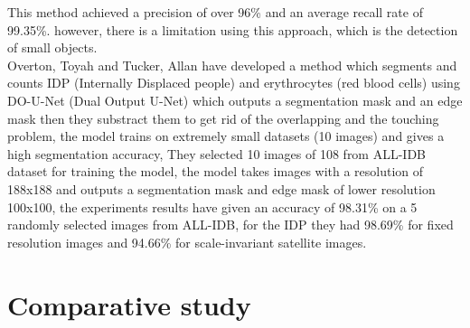 This method achieved a precision of over 96\% and an average recall rate of 99.35\%. however, there is a limitation using this approach, which is the detection of small objects.\\

Overton, Toyah and Tucker, Allan \textsuperscript{\cite{10.1007/978-3-030-44584-3_31}} have developed a method which segments and counts IDP (Internally Displaced people) and erythrocytes (red blood cells) using DO-U-Net (Dual Output U-Net) which outputs a segmentation mask and an edge mask then they substract them to get rid of the overlapping and the touching problem, the model trains on extremely small datasets (10 images) and gives a high segmentation accuracy, They selected 10 images of 108 from ALL-IDB dataset for training the model, the model takes images with a resolution of 188x188 and outputs a segmentation mask and edge mask of lower resolution 100x100, the experiments results have given an accuracy of 98.31\% on a 5 randomly selected images from ALL-IDB, for the IDP they had 98.69\% for fixed resolution images and 94.66\% for scale-invariant satellite images.\\

\section{Comparative study}

